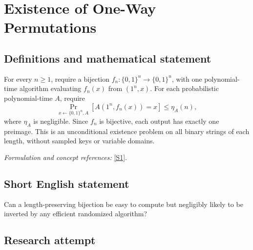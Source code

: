 \documentclass[11pt,a4paper]{article}
\newcommand{\sref}[2]{\hyperlink{source:#1:#2}{[S#2]}}
\newif\ifshowcatalogue
\newcommand{\cataloguescope}[1]{\ifshowcatalogue
 \paragraph{Exact scope in the supplied catalogue.}
 \begin{quote}\small #1\end{quote}\fi}
\numberwithin{equation}{section}
\begin{document}
\setcounter{section}{0}
\clearpage
\section*{\texorpdfstring{Existence of One-Way Permutations}{Existence of One-Way Permutations}}\label{30006696}
\subsection{Definitions and mathematical statement}
For every $n\ge1$, require a bijection $f_n:\{0,1\}^n\to\{0,1\}^n$, with one polynomial-time algorithm evaluating $f_n(x)$ from $(1^n,x)$. For each probabilistic polynomial-time $A$, require
\[
 \Pr_{x\leftarrow\{0,1\}^n,A}[A(1^n,f_n(x))=x]\le\eta_A(n),
\]
where $\eta_A$ is negligible. Since $f_n$ is bijective, each output has exactly one preimage. This is an unconditional existence problem on all binary strings of each length, without sampled keys or variable domains.
\par\smallskip\textit{Formulation and concept references:} \sref{30006696}{1}.
\cataloguescope{There exists a family f\_n:\{0,1\}\textasciicircum{}n->\{0,1\}\textasciicircum{}n, n>=1, of bijections computed by one deterministic polynomial-time algorithm on (1\textasciicircum{}n,x), such that for every probabilistic polynomial-time algorithm A its inversion success Pr[A(1\textasciicircum{}n,f\_n(x))=x], over uniform x and A's coins, is negligible in n: for every c>0 it is at most n\textasciicircum{}(-c) for all sufficiently large n. This is unconditional existence in the classical unrelativized model, with no key sampling or variable domains.}
\subsection{Short English statement}
Can a length-preserving bijection be easy to compute but negligibly likely to be inverted by any efficient randomized algorithm?
\subsection{Research attempt}
\end{document}
